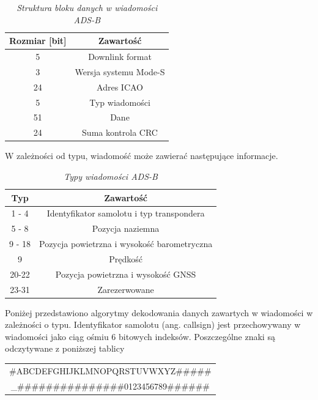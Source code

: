 \documentclass[eng,printmode]{mgr}
\begin{document}
\begin{table}[htb]
\def\arraystretch{1.3}%
\caption{\textit{ Struktura bloku danych w wiadomości ADS-B}}
\label{tab:adsbFrame}
\begin{center}
\begin{tabular}{ |c|c| }
\hline
Rozmiar [bit] & Zawartość\\
\hline
5 & Downlink format\\
\hline
3 & Wersja systemu Mode-S\\
\hline
24 & Adres ICAO\\
\hline
5 & Typ wiadomości\\
\hline
51 & Dane\\
\hline
24 & Suma kontrola CRC\\
\hline
\end{tabular}
\end{center}
\end{table}
\noindent
W zależności od typu, wiadomość może zawierać następujące informacje.

\begin{table}[htb]
\def\arraystretch{1.3}%
\caption{\textit{ Typy wiadomości ADS-B}}
\label{tab:adsbFrame}
\begin{center}
\begin{tabular}{ |c|c| }
\hline
Typ & Zawartość\\
\hline
1 - 4 & Identyfikator samolotu i typ transpondera\\
\hline
5 - 8 & Pozycja naziemna\\
\hline
9 - 18 &  Pozycja powietrzna i wysokość barometryczna\\
\hline
9 & Prędkość\\
\hline
20-22 &  Pozycja powietrzna i wysokość GNSS\\
\hline
23-31 & Zarezerwowane\\
\hline
\end{tabular}
\end{center}
\end{table}

\newpage
Poniżej przedstawiono algorytmy dekodowania danych zawartych w wiadomości w zależności o typu.
\vskip 0.5cm
Identyfikator samolotu (ang. callsign) jest przechowywany w wiadomości jako ciąg ośmiu 6 bitowych indeksów. Poszczególne znaki są odczytywane z poniższej tablicy 

\begin{table}[htb]
\label{tab:adsb}
  \centering
  \def\arraystretch{1.3}%
  \begin{tabular}{c}
       \#ABCDEFGHIJKLMNOPQRSTUVWXYZ\#\#\#\#\#\\
\_\#\#\#\#\#\#\#\#\#\#\#\#\#\#\#0123456789\#\#\#\#\#\#
 \end{tabular}
\end{table}
\end{document}
